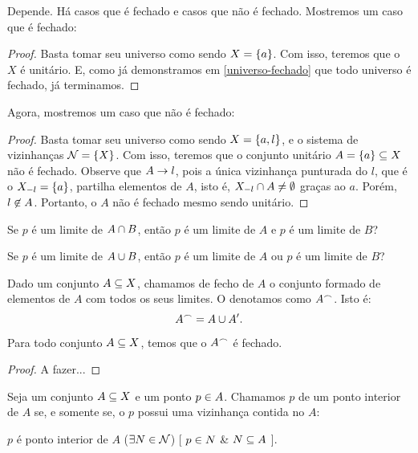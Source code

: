 \begin{answer}
	Depende. Há casos que é fechado e casos que não é fechado. Mostremos um caso que é fechado:
	\begin{proof}	
		Basta tomar seu universo como sendo $X = \left\{a\right\}$. Com isso, teremos que o $X$ é unitário. E, como já demonstramos em \ref{universo-fechado} que todo universo é fechado, já terminamos. 
	\end{proof}
	Agora, mostremos um caso que não é fechado:
	\begin{proof}
		Basta tomar seu universo como sendo $X = \left\{a,l\right\}$, e o sistema de vizinhanças $\mathcal{N} = \left\{X\right\}$. Com isso, teremos que o conjunto unitário $A = \left\{a\right\} \subseteq X$ não é fechado. Observe que $A \rightarrow l$, pois a única vizinhança punturada do $l$, que é o $X_{-l} = \left\{a\right\}$, partilha elementos de $A$, isto é, $X_{-l} \cap A \neq \emptyset$ graças ao $a$. Porém, $l \not\in A$. Portanto, o $A$ não é fechado mesmo sendo unitário.
	\end{proof}
\end{answer}

\begin{question}
	Se $p$ é um limite de $A \cap B$, então $p$ é um limite de $A$ e $p$ é um limite de $B$?
\end{question}

\begin{question}
	Se $p$ é um limite de $A \cup B$, então $p$ é um limite de $A$ ou $p$ é um limite de $B$?
\end{question}

\begin{definition}
	\label{def:fecho}
	Dado um conjunto $A \subseteq X$, chamamos de fecho de $A$ o conjunto formado de elementos de $A$ com todos os seus limites. O denotamos como $A^{\frown}$. Isto é:
	\[
		A^{\frown} = A \cup A^{\prime}.
	\]
\end{definition}

\begin{theorem}
	\label{thm:fecho-fechado}
	Para todo conjunto $A \subseteq X$, temos que o $A^{\frown}$ é fechado.
\end{theorem}

\begin{proof}
	A fazer...
\end{proof}

\begin{definition}
	\label{def:ponto-interior}
	Seja um conjunto $A \subseteq X$ e um ponto $p \in A$. Chamamos $p$ de um ponto interior de $A$ se, e somente se, o $p$ possui uma vizinhança contida no $A$:
	\begin{center}
		$p$ é ponto interior de $A$ \sse
			($\exists N \in \mathcal{N}$)%
			[ $p \in N$ \& $N \subseteq A$ ].
	\end{center}
\end{definition}

